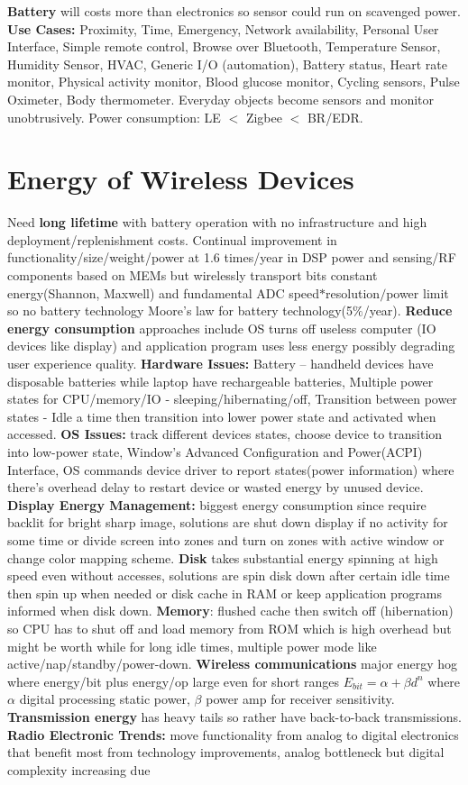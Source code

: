 \documentclass[9pt]{extarticle}
\begin{document}
\begin{multicols}{2}
\textbf{Battery} will costs more than electronics so sensor could run on scavenged power. \textbf{Use Cases:} Proximity, Time, Emergency, Network availability, Personal User Interface, Simple remote control, Browse over Bluetooth, Temperature Sensor, Humidity Sensor, HVAC, Generic I/O (automation), Battery status, Heart rate monitor, Physical activity monitor, Blood glucose monitor, Cycling sensors, Pulse Oximeter, Body thermometer. Everyday objects become sensors and monitor unobtrusively. Power consumption: LE $<$ Zigbee $<$ BR/EDR.

\section{Energy of Wireless Devices}

Need \textbf{long lifetime} with battery operation with no infrastructure and high deployment/replenishment costs. Continual improvement in functionality/size/weight/power at 1.6 times/year in DSP power and sensing/RF components based on MEMs but wirelessly transport bits constant energy(Shannon, Maxwell) and fundamental ADC speed$*$resolution$/$power limit so no battery technology Moore’s law for battery technology(5$\%$/year).\textbf{ Reduce energy consumption} approaches include OS turns off useless computer (IO devices like display) and application program uses less energy possibly degrading user experience quality.\textbf{ Hardware Issues:} Battery – handheld devices have disposable batteries while laptop have rechargeable batteries, Multiple power states for CPU/memory/IO - sleeping/hibernating/off, Transition between power states - Idle a time then transition into lower power state and activated when accessed. \textbf{OS Issues: }track different devices states, choose device to transition into low-power state, Window's Advanced Configuration and Power(ACPI) Interface, OS commands device driver to report states(power information) where there's overhead delay to restart device or wasted energy by unused device. \textbf{Display Energy Management:} biggest energy consumption since require backlit for bright sharp image, solutions are shut down display if no activity for some time or divide screen into zones and turn on zones with active window or change color mapping scheme. \textbf{Disk} takes substantial energy spinning at high speed even without accesses,  solutions are spin disk down after certain idle time then spin up when needed or disk cache in RAM or keep application programs informed when disk down. \textbf{Memory}: flushed cache then switch off (hibernation) so CPU has to shut off and load memory from ROM which is high overhead but might be worth while for long idle times, multiple power mode like active/nap/standby/power-down. \textbf{Wireless communications} major energy hog where energy/bit plus energy/op large even for short ranges $E_{bit}=\alpha+\beta{d^n}$ where $\alpha$ digital processing static power, $\beta$ power amp for receiver sensitivity. \textbf{Transmission energy} has heavy tails so rather have back-to-back transmissions. \textbf{Radio Electronic Trends:} move functionality from analog to digital electronics that benefit most from technology improvements, analog bottleneck but digital complexity increasing due 
\end{multicols}
\end{document}
